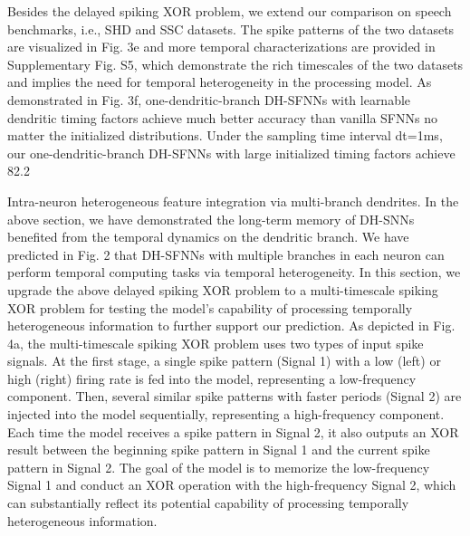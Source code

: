 Besides the delayed spiking XOR problem, we extend our comparison on speech benchmarks, i.e., SHD and SSC datasets. The spike patterns of the two datasets are visualized in Fig. 3e and more temporal characterizations are provided in Supplementary Fig. S5, which demonstrate the rich timescales of the two datasets and implies the need for temporal heterogeneity in the processing model. As demonstrated in Fig. 3f, one-dendritic-branch DH-SFNNs with learnable dendritic timing factors achieve much better accuracy than vanilla SFNNs no matter the initialized distributions. Under the sampling time interval dt=1ms, our one-dendritic-branch DH-SFNNs with large initialized timing factors achieve 82.2%

Intra-neuron heterogeneous feature integration
via multi-branch dendrites. In the above section, we have demonstrated the long-term memory of DH-SNNs benefited from the temporal dynamics on the dendritic branch. We have predicted in Fig. 2 that DH-SFNNs with multiple branches in each neuron can perform temporal computing tasks via temporal heterogeneity. In this section, we upgrade the above delayed spiking XOR problem to a multi-timescale spiking XOR problem for testing the model’s capability of processing temporally heterogeneous information to further support our prediction. As depicted in Fig. 4a, the multi-timescale spiking XOR problem uses two types of input spike signals. At the first stage, a single spike pattern (Signal 1) with a low (left) or high (right) firing rate is fed into the model, representing a low-frequency component. Then, several similar spike patterns with faster periods (Signal 2) are injected into the model sequentially, representing a high-frequency component. Each time the model receives a spike pattern in Signal 2, it also outputs an XOR result between the beginning spike pattern in Signal 1 and the current spike pattern in Signal 2. The goal of the model is to memorize the low-frequency Signal 1 and conduct an XOR operation with the high-frequency Signal 2, which can substantially reflect its potential capability of processing temporally heterogeneous information.

